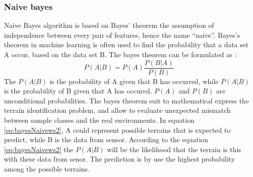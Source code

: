 \documentclass[USenglish]{ifimaster}  %
\begin{document}
\subsubsection{Naive bayes}
Naive Bayes algorithm is based on Bayes’ theorem the assumption of independence between every pair of features, hence the name “naive”. Bayes's theorem in machine learning is often used to find the probability that a data set A occur, based on the data set B. The bayes theorem can be formulated as \cite{Press:2007:NRE:1403886}:
\begin{equation}
P(A \vert B) = P(A)\frac{P(B \vert A)}{P(B)}
\label{eq:bayesNaivews2}
\end{equation}
The $P(A \vert B)$ is the probability of A given that B has occurred, while $P(A \vert B)$ is the probability of B given that A has occured. $P(A)$ and $P(B)$ are unconditional probabilities. The bayes theorem suit to mathematical express the terrain identification problem, and allow to evaluate unexpected mismatch between sample classes and the real environments. In equation \ref{eq:bayesNaivews2}, A could represent possible terrains that is expected to predict, while B is the data from sensor. According to the equation \ref{eq:bayesNaivews2} the $P(A \vert B)$ will be the likelihood that the terrain is this with these data from senor. The prediction is by use the highest probability among the possible terrains. 
\end{document}
